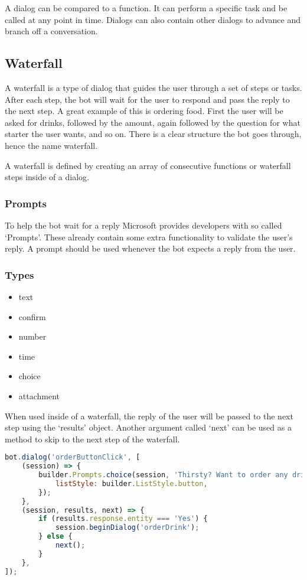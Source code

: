 A dialog can be compared to a function. It can perform a specific task and be called at any point in time. Dialogs can also contain other dialogs to advance and branch off a conversation.

\subsection{Waterfall}

A waterfall is a type of dialog that guides the user through a set of steps or tasks. After each step, the bot will wait for the user to respond and pass the reply to the next step. A great example of this is ordering food. First the user will be asked for drinks, followed by the amount, again followed by the question for what starter the user wants, and so on. There is a clear structure the bot goes through, hence the name waterfall.

A waterfall is defined by creating an array of consecutive functions or waterfall steps inside of a dialog.

\subsubsection{Prompts}

To help the bot wait for a reply Microsoft provides developers with so called `Prompts'. These already contain some extra functionality to validate the user's reply. A prompt should be used whenever the bot expects a reply from the user.

\subsubsection{Types}

\begin{itemize}
	\item text
	\item confirm
	\item number
	\item time
	\item choice
	\item attachment
\end{itemize}

When used inside of a waterfall, the reply of the user will be passed to the next step using the `results' object. Another argument called `next' can be used as a method to skip to the next step of the waterfall.

\begin{lstlisting}[language=JavaScript,caption=2-step waterfall using a prompt,label=listing:waterfall-and-prompt]
bot.dialog('orderButtonClick', [
	(session) => {
		builder.Prompts.choice(session, 'Thirsty? Want to order any drinks?', 'Yes|No drinks', {
			listStyle: builder.ListStyle.button,
		});
	},
	(session, results, next) => {
		if (results.response.entity === 'Yes') {
			session.beginDialog('orderDrink');
		} else {
			next();
		}
	},
]);
\end{lstlisting}

